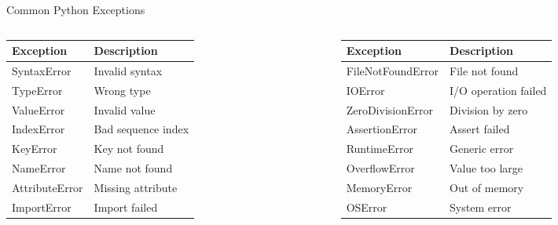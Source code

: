 \documentclass[aspectratio=169]{beamer}
\begin{document}
\begin{frame}{Common Python Exceptions}
    \begin{columns}
        \begin{column}{0.48\textwidth}
            \begin{table}
            \small
            \begin{tabular}{@{}ll@{}}
                \textbf{Exception} & \textbf{Description} \\ \hline
                SyntaxError & Invalid syntax \\
                TypeError & Wrong type \\
                ValueError & Invalid value \\
                IndexError & Bad sequence index \\
                KeyError & Key not found \\
                NameError & Name not found \\
                AttributeError & Missing attribute \\
                ImportError & Import failed \\ \hline
            \end{tabular}
            \end{table}
        \end{column}
        \begin{column}{0.48\textwidth}
            \begin{table}
            \small
            \begin{tabular}{@{}ll@{}}
                \textbf{Exception} & \textbf{Description} \\ \hline
                FileNotFoundError & File not found \\
                IOError & I/O operation failed \\
                ZeroDivisionError & Division by zero \\
                AssertionError & Assert failed \\
                RuntimeError & Generic error \\
                OverflowError & Value too large \\
                MemoryError & Out of memory \\
                OSError & System error \\ \hline
            \end{tabular}
            \end{table}
        \end{column}
    \end{columns}
\end{frame}
\end{document}
